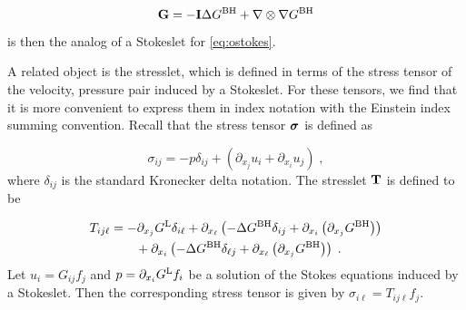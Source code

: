 \begin{equation} \label{eq:ostokeslet}
  {\bf G} = - {\bf I} \Delta G^{\textrm{BH}} + \nabla \otimes \nabla G^{\textrm{BH}}
\end{equation}
is then the analog of a Stokeslet
\cite{Pozrikidis1992} for \eqref{eq:ostokes}.

A related object is the stresslet, which is defined
in terms of the stress tensor of the velocity, pressure
pair induced by a Stokeslet. For these tensors, we find
that it is more convenient to express them in index notation
with the Einstein index summing convention.
Recall that the stress tensor ${\boldsymbol \sigma}$ is defined as 

\begin{equation}
  \sigma_{ij} = -p \delta_{ij} + \left ( \partial_{x_j}u_i
  +\partial_{x_i} u_j \right ) \; , \nonumber
\end{equation}
where $\delta_{ij}$ is the standard Kronecker delta notation.
The stresslet ${\bf T}$ is defined to be

\begin{align}
  T_{ij\ell} &= - \partial_{x_j} G^{\textrm{L}} \delta_{i\ell}
  + \partial_{x_\ell} \left ( -\Delta G^{\textrm{BH}} \delta_{ij} +
  \partial_{x_i} \left(\partial_{x_j} G^{\textrm{BH}} \right) \right)
  \nonumber \\
  & \qquad+ \partial_{x_i} \left ( -\Delta G^{\textrm{BH}} \delta_{\ell j} +
  \partial_{x_\ell} \left(\partial_{x_j} G^{\textrm{BH}} \right) \right)
  \; . \label{eq:ostress} 
\end{align}
Let $u_i = G_{ij} f_j$ and $p = \partial_{x_i} G^{\textrm{L}} f_i$ be a
solution of the Stokes equations induced by a Stokeslet.
Then the corresponding stress tensor is given by
$\sigma_{i\ell} = T_{ij\ell} f_j$.

%
%

